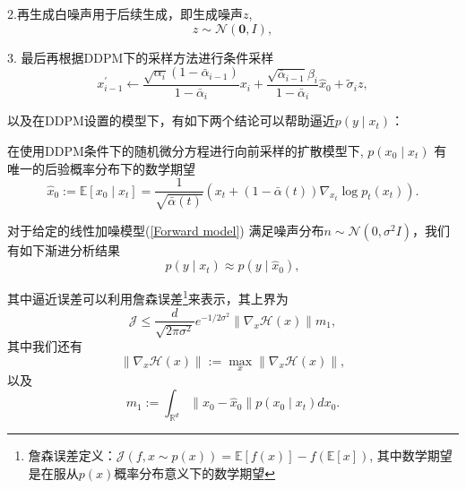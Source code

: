         2.再生成白噪声用于后续生成，即生成噪声$z$,
\begin{equation}
    {z} \sim \mathcal{N}(\mathbf{0}, {I}), 
\end{equation}
      
      
      3. 最后再根据DDPM下的采样方法进行条件采样
\begin{equation}
     {x}_{i-1}^{\prime} \leftarrow \frac{\sqrt{\alpha_i}\left(1-\bar{\alpha}_{i-1}\right)}{1-\bar{\alpha}_i} {x}_i+\frac{\sqrt{\bar{\alpha}_{i-1}} \beta_i}{1-\bar{\alpha}_i} \hat{{x}}_0+\tilde{\sigma}_i {z},
\end{equation}


以及在DDPM设置的模型下，有如下两个结论可以帮助逼近$p(y\mid x_t)$：

\begin{proposition}
\label{prop 1}
     在使用DDPM条件下的随机微分方程进行向前采样的扩散模型下, $p\left(x_0 \mid x_t\right)$ 有唯一的后验概率分布下的数学期望
\begin{equation}
    \hat{x}_0:=\mathbb{E}\left[x_0 \mid x_t\right]=\frac{1}{\sqrt{\bar{\alpha}(t)}}\left(x_t+(1-\bar{\alpha}(t)) \nabla_{x_t} \log p_t\left(x_t\right)\right).
\end{equation}
\end{proposition}
\begin{theorem}
\label{thm 1}
对于给定的线性加噪模型(\ref{Forward model}) 满足噪声分布${n} \sim \mathcal{N}\left(0, \sigma^2 {I}\right)$，我们有如下渐进分析结果
\begin{equation}
  p\left(y \mid x_t\right) \approx p\left(y \mid \hat{x}_0\right),
  \label{Thm 1 eq 1}
\end{equation}

其中逼近误差可以利用詹森误差\footnote{詹森误差定义：$\mathcal{J}(f,x\sim p(x)) = \mathbb{E}[f(x)]-f(\mathbb{E}[x])$, 其中数学期望是在服从$p(x)$概率分布意义下的数学期望}来表示，其上界为
\begin{equation}
\mathcal{J} \leq \frac{d}{\sqrt{2 \pi \sigma^2}} e^{-1 / 2 \sigma^2}\left\|\nabla_{x} \mathcal{H}(x)\right\| m_1,
    \label{upper bound thm 1}
\end{equation}
其中我们还有
\begin{equation}
    \left\|\nabla_{x} \mathcal{H}(x)\right\|:=\max _{x}\left\|\nabla_{x} \mathcal{H}(x)\right\|,
\end{equation}
以及
\begin{equation}
m_1:=\int_{\mathbb{R}^d}\left\|x_0-\hat{x}_0\right\| p\left(x_0 \mid x_t\right) d x_0 .
\end{equation}
\end{theorem}
